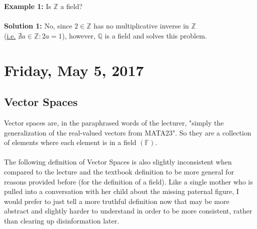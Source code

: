 \documentclass[12pt]{article}
\begin{document}
\textbf{Example 1:} Is $\mathbb{Z}$ a field?\\
\\
\textbf{Solution 1:} No, since $2 \in\mathbb{Z}$ has no multiplicative inverse in $\mathbb{Z}$\\ (\underline{i.e.} $\nexists a \in\mathbb{Z} : 2a = 1$), however, $\mathbb{Q}$ is a field and solves this problem.

\section{Friday, May 5, 2017}

\subsection{Vector Spaces}

Vector spaces are, in the paraphrased words of the lecturer, "simply the generalization of the real-valued vectors from MATA23". So they are a collection of elements where each element is in a field $(\mathbb{F})$.\\
\\
The following definition of Vector Spaces is also slightly inconsistent when compared to the lecture and the textbook definition to be more general for reasons provided before (for the definition of a field). Like a single mother who is pulled into a conversation with her child about the missing paternal figure, I would prefer to just tell a more truthful definition now that may be more abstract and slightly harder to understand in order to be more consistent, rather than clearing up disinformation later.
\end{document}
